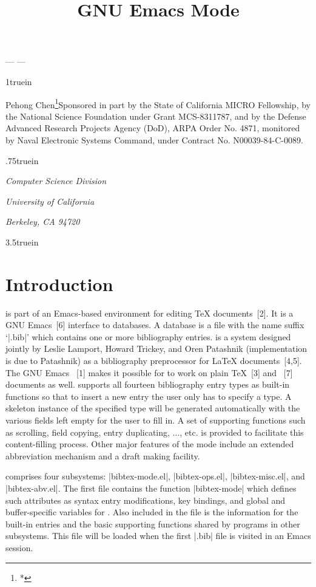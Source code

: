 % 
% 					
%



\title{GNU Emacs {\Bbf} Mode}
\bigskip
\centerline{\medbf --- {\version} ---}
\vglue 1truein
\centerline{{\medrm Pehong Chen}\footnote{*}{Sponsored in part by 
the State of California MICRO Fellowship, by
the National Science Foundation under Grant MCS-8311787,
and by the Defense Advanced Research Projects Agency (DoD),
ARPA Order No. 4871, monitored by Naval Electronic Systems Command,
under Contract No. N00039-84-C-0089.}}
\vglue .75truein
\centerline{\sl Computer Science Division}
\centerline{\sl University of California}
\centerline{\sl Berkeley, CA 94720}
\vglue 3.5truein
\centerline{\versiondate}
\vfill\eject
 
\setpagenumbers
{}
\toc

\vfill\eject

\nopagenumbers
{}
\chapter{Introduction}

\noindent
{\BM} is part of an Emacs-based environment for editing {\TeX} documents~[2].
It is a GNU Emacs~[6] interface to {\BibTeX} databases.
A {\BibTeX} database is a file with the name 
suffix `|.bib|' which contains one or more bibliography entries.
{\BibTeX} is a system designed jointly by Leslie Lamport, Howard Trickey,
and Oren Patashnik (implementation is due to Patashnik)
as a bibliography preprocessor for {\LaTeX} documents~[4,5].
The GNU Emacs {\TM}~[1] makes it possible for {\BibTeX} to work on plain 
{\TeX}~[3] and {\AmSTeX}~[7] documents as well.  
{\BM} supports all fourteen {\BibTeX} bibliography entry types as built-in
functions so that to insert a new entry the user only has to specify a type.
A skeleton instance of the specified type will be generated automatically
with the various fields left empty for the user to fill in.
A set of supporting functions such as scrolling, field copying,
entry duplicating, ..., etc. is provided to facilitate this content-filling
process.  Other major features of the mode include an extended abbreviation 
mechanism and a draft making facility.

{\BM} comprises four subsystems: |bibtex-mode.el|, |bibtex-ops.el|,
|bibtex-misc.el|, and |bibtex-abv.el|.
The first file contains the function |bibtex-mode| which defines such 
attributes as syntax entry modifications, key bindings, and
global and buffer-specific variables for {\BM}.  Also included in the file
is the information for the built-in entries and the basic supporting
functions shared by programs in other subsystems.  This file will be
loaded when the first |.bib| file is visited in an Emacs session.

